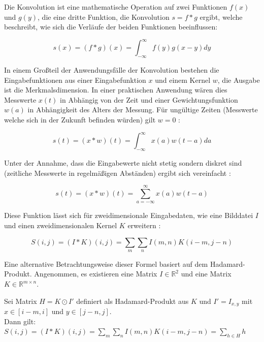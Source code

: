 \bigskip

Die Konvolution ist eine mathematische Operation auf zwei Funktionen $f(x)$ und $g(y)$, die eine dritte Funktion, die Konvolution $s = f*g$ ergibt, welche beschreibt, wie sich die Verläufe der beiden Funktionen beeinflussen:

\begin{equation}
s(x) = (f*g)(x) = \int_{-\infty}^{\infty} f(y)g(x-y)dy
\end{equation}

In einem Großteil der Anwendungsfälle der Konvolution bestehen die Eingabefunktionen aus einer Eingabefunktion $x$ und einem Kernel $w$, die Ausgabe ist die Merkmalsdimension. In einer praktischen Anwendung wären dies \bspw Messwerte $x(t)$ in Abhängig von der Zeit und einer Gewichtungsfunktion $w(a)$ in Abhängigkeit des Alters der Messung. Für ungültige Zeiten (\bspw Messwerte welche sich in der Zukunft befinden würden) gilt $w=0$ \cite[Kap.~9]{deeplearning_16}:

\begin{equation}
s(t) = (x*w)(t) = \int_{-\infty}^{\infty} x(a)w(t-a)da
\end{equation}

Unter der Annahme, dass die Eingabewerte nicht stetig sondern diskret sind (\bspw zeitliche Messwerte in regelmäßigen Abständen) ergibt sich vereinfacht \cite[Kap.~9]{deeplearning_16}:

\begin{equation}
s(t) = (x*w)(t) = \sum_{a=-\infty}^{\infty}x(a)w(t-a)
\end{equation}

Diese Funktion lässt sich für zweidimensionale Eingabedaten, wie \zB eine Bilddatei $I$ und einen zweidimensionalen Kernel $K$ erweitern \cite[Kap.~9]{deeplearning_16}:

\begin{equation}
S(i,j) = (I*K)(i,j) = \sum_{m}\sum_{n}I(m,n)K(i-m,j-n)
\end{equation}

Eine alternative Betrachtungsweise dieser Formel basiert auf dem Hadamard-Produkt. Angenommen, es existieren eine Matrix $I\in\mathbb{R}^{2}$ und eine Matrix $K\in\mathbb{R}^{m\times n}$.

Sei Matrix $H = K\odot I'$ definiert als Hadamard-Produkt aus $K$ und $I'=I_{x, y}$ mit $x\in[i-m,i]$ und $y\in[j-n,j]$.\\
Dann gilt: $S(i,j)=(I*K)(i,j) = \sum_{m}\sum_{n}I(m,n)K(i-m,j-n)=\sum_{h\in H}h$

